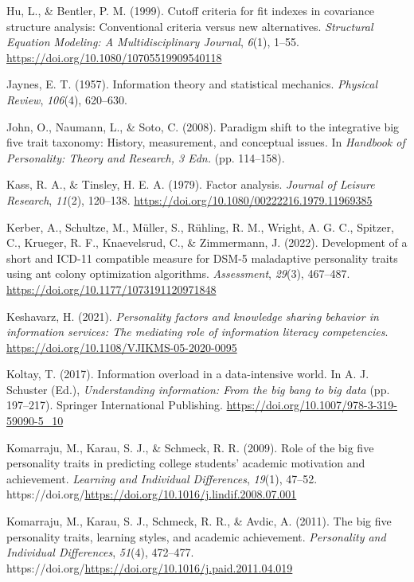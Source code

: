 \documentclass[
  12pt,
  a4paper,
  twoside]{article}
\newlength{\cslhangindent}
\newenvironment{CSLReferences}[2] %
 {\begin{list}{}{%
  \setlength{\itemindent}{0pt}
  \setlength{\leftmargin}{0pt}
  \setlength{\parsep}{0pt}
  \ifodd #1
   \setlength{\leftmargin}{\cslhangindent}
   \setlength{\itemindent}{-1\cslhangindent}
  \fi
  \setlength{\itemsep}{#2\baselineskip}}}
 {\end{list}}
\begin{document}
\begin{CSLReferences}{1}{0}
Hu, L., \& Bentler, P. M. (1999). Cutoff criteria for fit indexes in covariance structure analysis: Conventional criteria versus new alternatives. \emph{Structural Equation Modeling: A Multidisciplinary Journal}, \emph{6}(1), 1--55. \url{https://doi.org/10.1080/10705519909540118}

Jaynes, E. T. (1957). Information theory and statistical mechanics. \emph{Physical Review}, \emph{106}(4), 620--630.

John, O., Naumann, L., \& Soto, C. (2008). Paradigm shift to the integrative big five trait taxonomy: History, measurement, and conceptual issues. In \emph{Handbook of Personality: Theory and Research, 3 Edn.} (pp. 114--158).

Kass, R. A., \& Tinsley, H. E. A. (1979). Factor analysis. \emph{Journal of Leisure Research}, \emph{11}(2), 120--138. \url{https://doi.org/10.1080/00222216.1979.11969385}

Kerber, A., Schultze, M., Müller, S., Rühling, R. M., Wright, A. G. C., Spitzer, C., Krueger, R. F., Knaevelsrud, C., \& Zimmermann, J. (2022). Development of a short and ICD-11 compatible measure for DSM-5 maladaptive personality traits using ant colony optimization algorithms. \emph{Assessment}, \emph{29}(3), 467--487. \url{https://doi.org/10.1177/1073191120971848}

Keshavarz, H. (2021). \emph{Personality factors and knowledge sharing behavior in information services: The mediating role of information literacy competencies}. \url{https://doi.org/10.1108/VJIKMS-05-2020-0095}

Koltay, T. (2017). Information overload in a data-intensive world. In A. J. Schuster (Ed.), \emph{Understanding information: From the big bang to big data} (pp. 197--217). Springer International Publishing. \url{https://doi.org/10.1007/978-3-319-59090-5_10}

Komarraju, M., Karau, S. J., \& Schmeck, R. R. (2009). Role of the big five personality traits in predicting college students' academic motivation and achievement. \emph{Learning and Individual Differences}, \emph{19}(1), 47--52. https://doi.org/\url{https://doi.org/10.1016/j.lindif.2008.07.001}

Komarraju, M., Karau, S. J., Schmeck, R. R., \& Avdic, A. (2011). The big five personality traits, learning styles, and academic achievement. \emph{Personality and Individual Differences}, \emph{51}(4), 472--477. https://doi.org/\url{https://doi.org/10.1016/j.paid.2011.04.019}


\end{CSLReferences}
\end{document}
